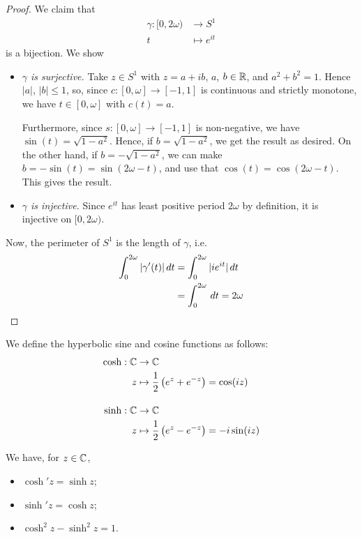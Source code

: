 \documentclass{../../template/note}
\begin{document}
    \begin{proof}
        We claim that
        \begin{align*}
            \gamma: [0, 2\omega) &\to S^1 \\
            t &\mapsto e^{it}
        \end{align*}
        is a bijection. We show
        \begin{itemize}
            \item \emph{\(\gamma\) is surjective.} Take \(z \in S^1\) with \(z=a+ib\), \(a\), \(b \in \mathbb R\), and \(a^2+b^2=1\). Hence \(|a|\), \(|b| \leq 1\), so, since \(c: [0, \omega] \to [-1, 1]\) is continuous and strictly monotone, we have \(t \in [0, \omega]\) with \(c(t) = a\).
            
            Furthermore, since \(s: [0, \omega] \to [-1, 1]\) is non-negative, we have \(\sin(t) = \sqrt{1-a^2}\). Hence, if \(b=\sqrt{1-a^2}\), we get the result as desired. On the other hand, if \(b=-\sqrt{1-a^2}\), we can make \(b=-\sin(t)=\sin(2\omega-t)\), and use that \(\cos(t)=\cos(2\omega-t)\). This gives the result.

            \item \emph{\(\gamma\) is injective.} Since \(e^{it}\) has least positive period \(2\omega\) by definition, it is injective on \([0, 2\omega)\).
        \end{itemize}

        Now, the perimeter of \(S^1\) is the length of \(\gamma\), i.e.
        \begin{align*}
            \int_0^{2\omega} |\gamma'(t)| \,d{t} &= \int_0^{2\omega} |ie^{it}| \,d{t} \\
            &= \int_0^{2\omega} \,d{t} = 2\omega
        \end{align*}
    \end{proof}
    
    \begin{definition}
        We define the hyperbolic sine and cosine functions as follows:
        \begin{align*}
            \cosh: \mathbb C &\to \mathbb C \\
            z &\mapsto \frac 1 2 \left(e^z+e^{-z}\right) = \cos(iz) \\[10pt]
            \sinh: \mathbb C &\to \mathbb C \\
            z &\mapsto \frac 1 2 \left(e^z-e^{-z}\right) = -i\sin(iz)
        \end{align*}
    \end{definition}
    
    \begin{lemma}
        We have, for \(z \in \mathbb C\),
        \begin{itemize}
            \item \(\cosh'z=\sinh z\);
            \item \(\sinh'z=\cosh z\);
            \item \(\cosh^2z-\sinh^2z=1\).
        \end{itemize}
    \end{lemma}
    
    
    
    
    
    
    
    
    
\end{document}
